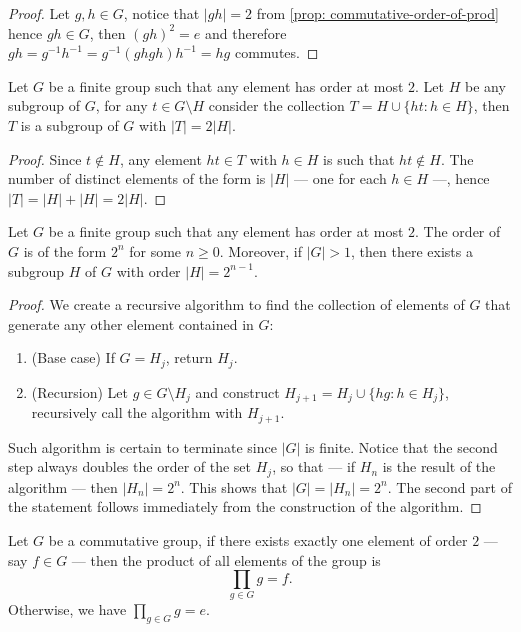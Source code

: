 \begin{proof}
Let \(g, h \in G\), notice that \(|gh| = 2\) from \cref{prop:
commutative-order-of-prod} hence \(gh \in G\), then \((gh)^2 = e\) and
therefore \(gh = g^{-1} h^{-1} = g^{-1}(ghgh)h^{-1} = hg\) commutes.
\end{proof}

\begin{lemma}
Let \(G\) be a finite group such that any element has order at most \(2\). Let
\(H\) be any subgroup of \(G\), for any \(t \in G \setminus H\) consider the
collection \(T = H \cup \{h t \colon h \in H\}\), then \(T\) is a subgroup of \(G\)
with \(|T| = 2|H|\).
\end{lemma}

\begin{proof}
Since \(t \not\in H\), any element \(ht \in T\) with \(h \in H\) is such that
\(ht \not\in H\). The number of distinct elements of the form is \(|H|\) ---
one for each \(h \in H\) ---, hence \(|T| = |H| + |H| = 2|H|\).
\end{proof}

\begin{lemma}[Order \(2^n\)]\label{lem: order-2n}
Let \(G\) be a finite group such that any element has order at most \(2\). The
order of \(G\) is of the form \(2^n\) for some \(n \geq 0\). Moreover, if
\(|G| > 1\), then there exists a subgroup \(H\) of \(G\) with order \(|H| =
2^{n-1}\).
\end{lemma}

\begin{proof}
We create a recursive algorithm to find the collection of elements of \(G\)
that generate any other element contained in \(G\):
\begin{enumerate}
  \item (Base case) If \(G = H_j\), return \(H_j\).
  \item (Recursion) Let \(g \in G \setminus H_j\) and construct \(H_{j + 1} =
    H_j \cup \{h g \colon h \in H_j\}\), recursively call the algorithm with \(H_{j
    + 1}\).
\end{enumerate}
Such algorithm is certain to terminate since \(|G|\) is finite. Notice that
the second step always doubles the order of the set \(H_j\), so that --- if
\(H_n\) is the result of the algorithm --- then \(|H_n| = 2^n\). This shows
that \(|G| = |H_n| = 2^n\). The second part of the statement follows
immediately from the construction of the algorithm.
\end{proof}

\begin{proposition}
Let \(G\) be a commutative group, if there exists exactly one element of order
\(2\) --- say \(f \in G\) --- then the product of all elements of the group is
\[
  \prod_{g \in G} g = f.
\]
Otherwise, we have \(\prod_{g \in G} g = e\).
\end{proposition}


